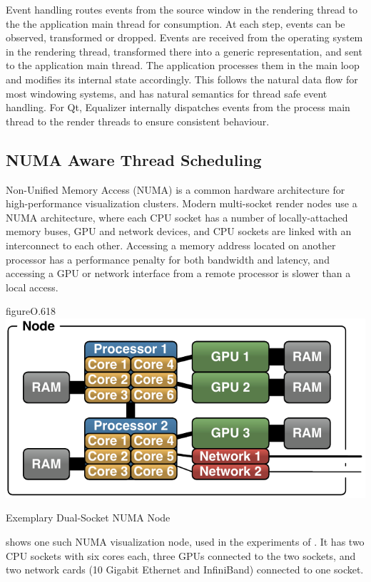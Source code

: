 Event handling routes events from the source window in the rendering thread to
the the application main thread for consumption. At each step, events can be
observed, transformed or dropped. Events are received from the operating system
in the rendering thread, transformed there into a generic representation, and
sent to the application main thread. The application processes them in the main
loop and modifies its internal state accordingly. This follows the natural data
flow for most windowing systems, and has natural semantics for thread safe
event handling. For Qt, Equalizer internally dispatches events from the process
main thread to the render threads to ensure consistent behaviour.

\subsection{NUMA Aware Thread Scheduling}

Non-Unified Memory Access (NUMA) is a common hardware architecture for
high-performance visualization clusters. Modern multi-socket render nodes use a
NUMA architecture, where each CPU socket has a number of locally-attached
memory buses, GPU and network devices, and CPU sockets are linked with an
interconnect to each other. Accessing a memory address located on another
processor has a performance penalty for both bandwidth and latency, and
accessing a GPU or network interface from a remote processor is slower than a
local access.

\begin{wrapfloat}{figure}{O}{.618\textwidth}
 \includegraphics[width=.618\textwidth]{images/numaNode.pdf}
 {\caption{\label{fNumaNode}Exemplary Dual-Socket NUMA Node}}
\end{wrapfloat}

 shows one such NUMA visualization node, used in the experiments
of \cite{EBAHMP:12}. It has two CPU sockets with six cores each, three GPUs
connected to the two sockets, and two network cards (10 Gigabit Ethernet and
InfiniBand) connected to one socket.

